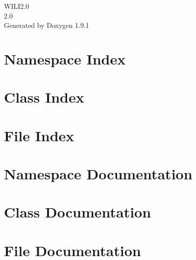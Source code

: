 \let\mypdfximage\pdfximage\def\pdfximage{\immediate\mypdfximage}\documentclass[twoside]{book}
\newcommand{\+}{\discretionary{\mbox{\scriptsize$\hookleftarrow$}}{}{}}
\newcommand{\clearemptydoublepage}{%
  \newpage{\pagestyle{empty}\cleardoublepage}%
}
\begin{document}
\raggedbottom

\hypersetup{pageanchor=false,
             bookmarksnumbered=true,
             pdfencoding=unicode
            }
\begin{titlepage}
\vspace*{7cm}
\begin{center}%
{\Large WILI2.0 \\[1ex]\large 2.\+0 }\\
\vspace*{1cm}
{\large Generated by Doxygen 1.9.1}\\
\end{center}
\end{titlepage}
\clearemptydoublepage
{}
\tableofcontents
\clearemptydoublepage
{}
\hypersetup{pageanchor=true}

\chapter{Namespace Index}

\chapter{Class Index}

\chapter{File Index}

\chapter{Namespace Documentation}







\chapter{Class Documentation}





\chapter{File Documentation}



























\backmatter
\newpage
{}
\clearemptydoublepage
{}
\printindex
\end{document}
